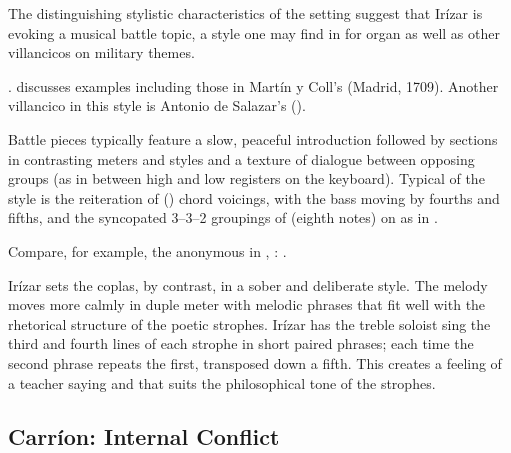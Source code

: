 
The distinguishing stylistic characteristics of the setting suggest that Irízar
is evoking a musical battle topic, a style one may find in  for
organ as well as other villancicos on military themes.%
\begin{Footnote}
    \Autocites
    []{Grove}
    [288--294]{Illari:Polychoral}.
    \Autocite{Sutton:IberianBatalla} discusses examples including those in
    Martín y Coll's  (Madrid, 1709).
    Another villancico in this style is Antonio de Salazar's  ().
\end{Footnote}
Battle pieces typically feature a slow, peaceful introduction followed by
sections in contrasting meters and styles and a texture of dialogue between
opposing groups (as in between high and low registers on the keyboard).  
Typical of the style is the reiteration of  () chord voicings, with the bass moving by fourths and fifths, and the
syncopated 3--3--2 groupings of  (eighth notes) on  as in .%
\begin{Footnote}
    Compare, for example, the anonymous  in ,
    : \autocite{Araujo:Batalla}.  
\end{Footnote}


Irízar sets the coplas, by contrast, in a sober and deliberate style.
The melody moves more calmly in duple meter with melodic phrases that fit well
with the rhetorical structure of the poetic strophes.  
Irízar has the treble soloist sing the third and fourth lines of each strophe in
short paired phrases; each time the second phrase repeats the first, transposed
down a fifth.
This creates a feeling of a teacher saying  and
 that suits the philosophical tone of the strophes.


\subsection{Carríon: Internal Conflict}

